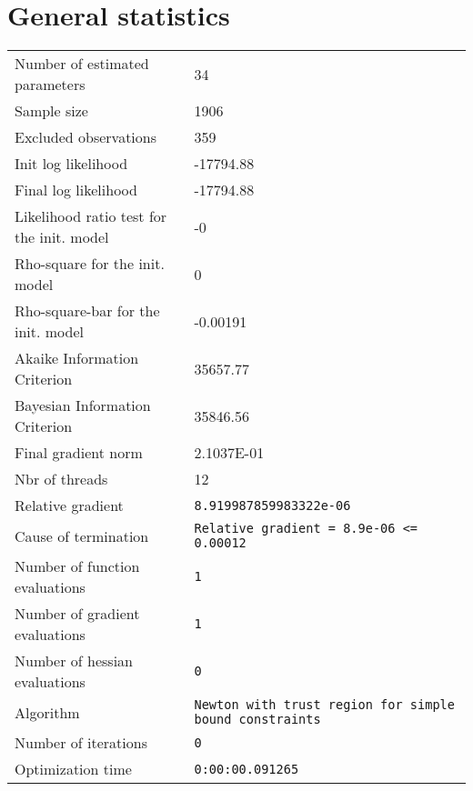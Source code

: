



\section{General statistics}
\begin{tabular}{ll}
Number of estimated parameters & 34 \\
Sample size & 1906 \\
Excluded observations & 359 \\
Init log likelihood & -17794.88 \\
Final log likelihood & -17794.88 \\
Likelihood ratio test for the init. model & -0 \\
Rho-square for the init. model & 0 \\
Rho-square-bar for the init. model & -0.00191 \\
Akaike Information Criterion & 35657.77 \\
Bayesian Information Criterion & 35846.56 \\
Final gradient norm & 2.1037E-01 \\
Nbr of threads & 12 \\
Relative gradient & \verb$8.919987859983322e-06$ \\
Cause of termination & \verb$Relative gradient = 8.9e-06 <= 0.00012$ \\
Number of function evaluations & \verb$1$ \\
Number of gradient evaluations & \verb$1$ \\
Number of hessian evaluations & \verb$0$ \\
Algorithm & \verb$Newton with trust region for simple bound constraints$ \\
Number of iterations & \verb$0$ \\
Optimization time & \verb$0:00:00.091265$ \\
\end{tabular}

